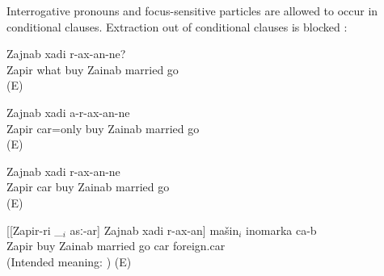 Interrogative pronouns  and focus-sensitive particles  are allowed to occur in conditional clauses. Extraction out of conditional clauses is blocked :
%
\begin{exe}
	\ex	\label{ex:Zapir, Zainab, and Heloise}
	\begin{xlist}
		\ex	\label{ex:If Zapir buys what Zainab will marry him}
			Zajnab	xadi	r-ax-an-ne?\\
			Zapir	what buy	Zainab	married	go\\
		\glt	{} (E) 

		\ex	\label{ex:If Zapir buys only a car, Zainab will not marry him}
		\gll	[Zapir-ri	mašin=cun	asː-ar]	Zajnab	xadi	a-r-ax-an-ne\\
			Zapir	car=only buy	Zainab	married	go\\
		\glt	{} (E) 

		\ex	\label{ex:If Zapir buys a foreign car, Zajnab will marry him}
			Zajnab	xadi	r-ax-an-ne\\
			Zapir	car buy	Zainab	married	go\\
		\glt	{} (E) 

		\ex	\label{ex:The car that if Zapir buys it Zainab will marry him is a foreign car}
		\gll	{*}	[[Zapir-ri	\_$_{i}$	asː-ar]	Zajnab	xadi	r-ax-an]	mašin$_{i}$	inomarka	ca-b\\
			{}	Zapir		buy	Zainab	married	go	car	foreign.car	\\
		\glt	(Intended meaning: ) (E) 
	\end{xlist}
\end{exe}



%
%
